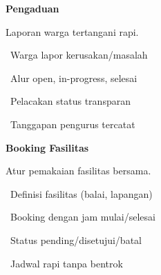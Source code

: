 \documentclass[a4paper]{article}
\begin{document}
\vspace{8pt}

\noindent
\begin{minipage}[t]{0.485\textwidth}
    \colorbox{PurplePrimary}{%
        \begin{minipage}{\dimexpr\textwidth-2\fboxsep\relax}
            {\fontsize{10}{13}\selectfont\bfseries\color{White} Pengaduan}
        \end{minipage}}\par
    \vspace{4pt}
    {\fontsize{9}{12}\selectfont\color{TextDark}%
    Laporan warga tertangani rapi.\par\vspace{3pt}
    \textbullet\ Warga lapor kerusakan/masalah\par\vspace{2pt}%
    \textbullet\ Alur open, in-progress, selesai\par\vspace{2pt}%
    \textbullet\ Pelacakan status transparan\par\vspace{2pt}%
    \textbullet\ Tanggapan pengurus tercatat}%

\end{minipage}%
\hfill
\begin{minipage}[t]{0.485\textwidth}
    \colorbox{BlueDark}{%
        \begin{minipage}{\dimexpr\textwidth-2\fboxsep\relax}
            {\fontsize{10}{13}\selectfont\bfseries\color{White} Booking Fasilitas}
        \end{minipage}}\par
    \vspace{4pt}
    {\fontsize{9}{12}\selectfont\color{TextDark}%
    Atur pemakaian fasilitas bersama.\par\vspace{3pt}
    \textbullet\ Definisi fasilitas (balai, lapangan)\par\vspace{2pt}%
    \textbullet\ Booking dengan jam mulai/selesai\par\vspace{2pt}%
    \textbullet\ Status pending/disetujui/batal\par\vspace{2pt}%
    \textbullet\ Jadwal rapi tanpa bentrok}%

\end{minipage}

\vspace{8pt}
\end{document}
